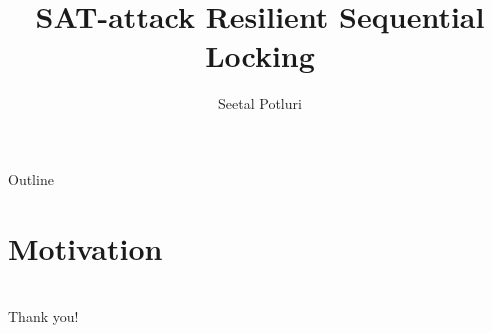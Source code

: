 \documentclass[xcolor=dvipsnames]{beamer}
\title[Slide Number\hspace{2em}\insertframenumber]
{SAT-attack Resilient Sequential Locking}
\subtitle
{}
\author[]
{Seetal Potluri}
\institute[Universities]
{
    Chair for Processor Design, Technical University of Dresden
}
\begin{document}
\begin{frame}
\titlepage
\end{frame}


\begin{frame}{Outline}
\tableofcontents
\end{frame}

\section{Motivation}









%
%
%
%
%
%
%
%
%





%

\section{}
\begin{frame}
\begin{center}
Thank you! 
\end{center}
\end{frame}
\end{document}
